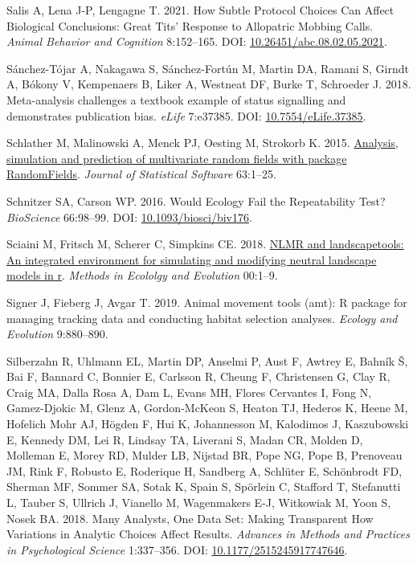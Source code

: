 \documentclass[10pt,a4paper]{article}
\newlength{\cslhangindent}
\newlength{\cslentryspacingunit} %
\newenvironment{CSLReferences}[2] %
 {%
  \setlength{\parindent}{0pt}
  \ifodd #1
  \let\oldpar\par
  \def\par{\hangindent=\cslhangindent\oldpar}
  \fi
  \setlength{\parskip}{#2\cslentryspacingunit}
 }%
 {}
\begin{document}
\begin{CSLReferences}{1}{0}
\leavevmode{}%
Salis A, Lena J-P, Lengagne T. 2021. How {Subtle} {Protocol} {Choices} {Can} {Affect} {Biological} {Conclusions}: {Great} {Tits}' {Response} to {Allopatric} {Mobbing} {Calls}. \emph{Animal Behavior and Cognition} 8:152--165. DOI: \href{https://doi.org/10.26451/abc.08.02.05.2021}{10.26451/abc.08.02.05.2021}.

\leavevmode{}%
Sánchez-Tójar A, Nakagawa S, Sánchez-Fortún M, Martin DA, Ramani S, Girndt A, Bókony V, Kempenaers B, Liker A, Westneat DF, Burke T, Schroeder J. 2018. Meta-analysis challenges a textbook example of status signalling and demonstrates publication bias. \emph{eLife} 7:e37385. DOI: \href{https://doi.org/10.7554/eLife.37385}{10.7554/eLife.37385}.

\leavevmode{}%
Schlather M, Malinowski A, Menck PJ, Oesting M, Strokorb K. 2015. \href{https://www.jstatsoft.org/v63/i08/}{Analysis, simulation and prediction of multivariate random fields with package {RandomFields}}. \emph{Journal of Statistical Software} 63:1--25.

\leavevmode{}%
Schnitzer SA, Carson WP. 2016. Would {Ecology} {Fail} the {Repeatability} {Test}? \emph{BioScience} 66:98--99. DOI: \href{https://doi.org/10.1093/biosci/biv176}{10.1093/biosci/biv176}.

\leavevmode{}%
Sciaini M, Fritsch M, Scherer C, Simpkins CE. 2018. \href{https://doi.org/10.1111/2041-210X.13076}{NLMR and landscapetools: An integrated environment for simulating and modifying neutral landscape models in r}. \emph{Methods in Ecololgy and Evolution} 00:1--9.

\leavevmode{}%
Signer J, Fieberg J, Avgar T. 2019. Animal movement tools (amt): R package for managing tracking data and conducting habitat selection analyses. \emph{Ecology and Evolution} 9:880--890.

\leavevmode{}%
Silberzahn R, Uhlmann EL, Martin DP, Anselmi P, Aust F, Awtrey E, Bahník Š, Bai F, Bannard C, Bonnier E, Carlsson R, Cheung F, Christensen G, Clay R, Craig MA, Dalla Rosa A, Dam L, Evans MH, Flores Cervantes I, Fong N, Gamez-Djokic M, Glenz A, Gordon-McKeon S, Heaton TJ, Hederos K, Heene M, Hofelich Mohr AJ, Högden F, Hui K, Johannesson M, Kalodimos J, Kaszubowski E, Kennedy DM, Lei R, Lindsay TA, Liverani S, Madan CR, Molden D, Molleman E, Morey RD, Mulder LB, Nijstad BR, Pope NG, Pope B, Prenoveau JM, Rink F, Robusto E, Roderique H, Sandberg A, Schlüter E, Schönbrodt FD, Sherman MF, Sommer SA, Sotak K, Spain S, Spörlein C, Stafford T, Stefanutti L, Tauber S, Ullrich J, Vianello M, Wagenmakers E-J, Witkowiak M, Yoon S, Nosek BA. 2018. Many {Analysts}, {One} {Data} {Set}: {Making} {Transparent} {How} {Variations} in {Analytic} {Choices} {Affect} {Results}. \emph{Advances in Methods and Practices in Psychological Science} 1:337--356. DOI: \href{https://doi.org/10.1177/2515245917747646}{10.1177/2515245917747646}.


\end{CSLReferences}
\end{document}
